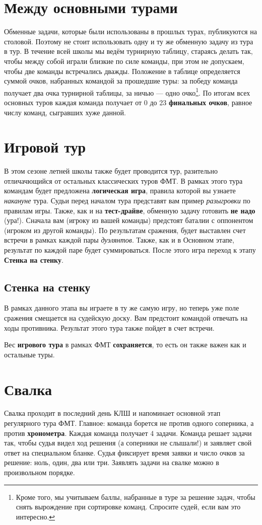 \documentclass[12pt]{article}
\begin{document}
\section*{Между основными турами}
Обменные задачи, которые были использованы в прошлых турах, публикуются на столовой. Поэтому не стоит использовать одну и ту же обменную задачу из тура в тур. В течение всей школы мы ведём турнирную таблицу, стараясь делать так, чтобы между собой играли близкие по силе команды, при этом не допускаем, чтобы две команды встречались дважды. Положение в таблице определяется суммой очков, набранных командой за прошедшие туры: за победу команда получает два очка турнирной таблицы, за ничью --- одно очко\footnote{Кроме того, мы учитываем баллы, набранные в туре за решение задач, чтобы снять вырождение при сортировке команд. Спросите судей, если вам это интересно.}. По итогам всех основных туров каждая команда получает от 0 до 23 {\bf финальных очков}, равное числу команд, сыгравших хуже данной.

\section*{Игровой тур}
В этом сезоне летней школы также будет проводится тур, разительно отличачющийся от остальных классических туров ФМТ. В рамках этого тура командам будет предложена \textbf{логическая игра}, правила которой вы узнаете {\it накануне} тура. Судьи перед началом тура представят вам пример {\it разыгровки} по правилам игры. Также, как и на {\bf тест-драйве}, обменную задачу готовить \textbf{не надо} (ура!). Сначала вам (игроку из вашей команды) предстоят баталии с оппонентом (игроком из другой команды). По результатам сражения, будет выставлен счет встречи в рамках каждой пары {\it дуэлянтов}. Также, как и в \textbf{}{Основном этапе}, результат по каждой паре будет суммироваться. После этого игра переход к этапу \textbf{Стенка на стенку}.
\subsection*{Стенка на стенку}
В рамках данного этапа вы играете в ту же самую игру, но теперь уже поле сражения смещается на судейскую доску. Вам предстоит командой отвечать на ходы противника. Результат этого тура также пойдет в счет встречи.

Вес \textbf{игрового тура} в рамках ФМТ \textbf{сохраняется}, то есть он также важен как и остальные туры.
\section*{Свалка}
Свалка проходит в последний день КЛШ и напоминает основной этап регулярного тура ФМТ. Главное: команда борется не против одного соперника, а против {\bf хронометра}. Каждая команда получает 4 задачи. Команда решает задачи так, чтобы судья видел ход решения (а соперники не слышали!) и заявляет свой ответ на специальном бланке. Судья фиксирует время заявки и число очков за решение: ноль, один, два или три. Заявлять задачи на свалке можно в произвольном порядке.
\end{document}
